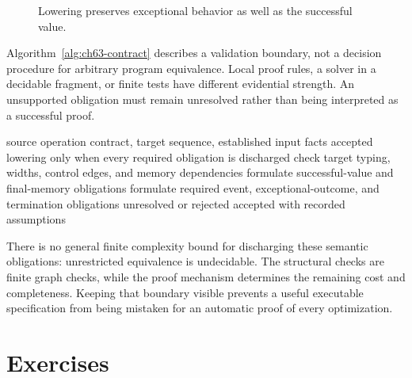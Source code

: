 \begin{figure}[htbp]
\centering
{}
\caption{Lowering preserves exceptional behavior as well as the successful value.}
\label{fig:ch63-lowering}
\end{figure}

Algorithm~\ref{alg:ch63-contract} describes a validation boundary, not a decision procedure for arbitrary program equivalence.
Local proof rules, a solver in a decidable fragment, or finite tests have different evidential strength.
An unsupported obligation must remain unresolved rather than being interpreted as a successful proof.

\begin{algorithm}[htbp]
\caption{Validate a proposed semantic lowering through explicit obligations.}
\label{alg:ch63-contract}
\begin{pseudocode}
\Require source operation contract, target sequence, established input facts
\Ensure accepted lowering only when every required obligation is discharged
\State check target typing, widths, control edges, and memory dependencies
\State formulate successful-value and final-memory obligations
\State formulate required event, exceptional-outcome, and termination obligations
    \State \Return unresolved or rejected
  \EndIf
\EndFor
\State \Return accepted with recorded assumptions
\end{pseudocode}
\end{algorithm}

There is no general finite complexity bound for discharging these semantic obligations: unrestricted equivalence is undecidable.
The structural checks are finite graph checks, while the proof mechanism determines the remaining cost and completeness.
Keeping that boundary visible prevents a useful executable specification from being mistaken for an automatic proof of every optimization.

\section{Exercises}
\label{sec:ch63-exercises}


